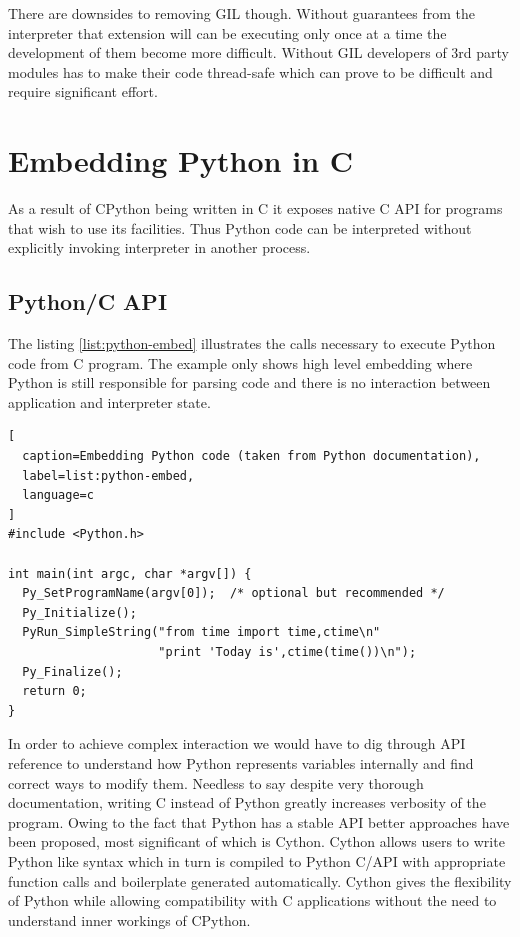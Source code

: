 \documentclass[12pt, a4paper]{report}
\begin{document}
There are downsides to removing GIL though. Without guarantees from
the interpreter that extension will can be executing only once at
a time the development of them become more difficult. Without GIL
developers of 3rd party modules has to make their code thread-safe
which can prove to be difficult and require significant effort.

\section{Embedding Python in C}\label{sec:python-embedding}
As a result of CPython being written in C it exposes native C API for
programs that wish to use its facilities. Thus Python code can be
interpreted without explicitly invoking interpreter in another process.

\subsection{Python/C API}\label{subsec:python-capi}
The listing \ref{list:python-embed} illustrates the calls necessary
to execute Python code from C program. The example only shows
high level embedding where Python is still responsible for parsing
code and there is no interaction between application and interpreter
state.

\begin{lstlisting}[
  caption=Embedding Python code (taken from Python documentation),
  label=list:python-embed,
  language=c
]
#include <Python.h>

int main(int argc, char *argv[]) {
  Py_SetProgramName(argv[0]);  /* optional but recommended */
  Py_Initialize();
  PyRun_SimpleString("from time import time,ctime\n"
                     "print 'Today is',ctime(time())\n");
  Py_Finalize();
  return 0;
}
\end{lstlisting}

In order to achieve complex interaction we would have to dig
through API reference to understand how Python represents variables
internally and find correct ways to modify them. Needless to say
despite very thorough documentation, writing C instead of Python
greatly increases verbosity of the program. Owing to the fact
that Python has a stable API better approaches have been proposed,
most significant of which is Cython. Cython allows users to write
Python like syntax which in turn is compiled to Python C/API
with appropriate function calls and boilerplate generated
automatically. Cython gives the flexibility of Python while allowing
compatibility with C applications without the need to understand
inner workings of CPython.
\end{document}
